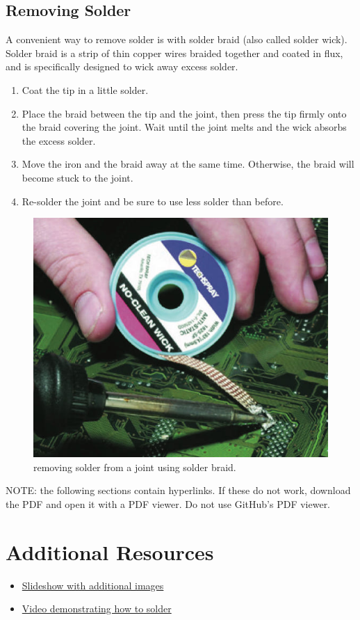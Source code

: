 \subsection{Removing Solder}
A convenient way to remove solder is with solder braid (also called solder wick). Solder braid is a strip of thin copper wires braided together and coated in flux, and is specifically designed to wick away excess solder.
\begin{enumerate}
    \item Coat the tip in a little solder.
    \item Place the braid between the tip and the joint, then press the tip firmly onto the braid covering the joint. Wait until the joint melts and the wick absorbs the excess solder.
    \item Move the iron and the braid away at the same time. Otherwise, the braid will become stuck to the joint.
    \item Re-solder the joint and be sure to use less solder than before.
\end{enumerate}
\begin{figure}[h]
    \caption{removing solder from a joint using solder braid.}
    \centering \includegraphics[scale=0.5]{images/wicking.jpg}
\end{figure}

\noindent NOTE: the following sections contain hyperlinks. If these do not work, download the PDF and open it with a PDF viewer. Do not use GitHub's PDF viewer.

\section{Additional Resources}
\begin{itemize}
    \item \href{https://docs.google.com/presentation/d/1gsUb53UJUmAFMdqCDinAuhG2tvJvpA0dKFnbgJBPr4M/edit?usp=sharing}{Slideshow with additional images}
    \item \href{https://www.youtube.com/watch?v=VxMV6wGS3NY}{Video demonstrating how to solder}
\end{itemize}

